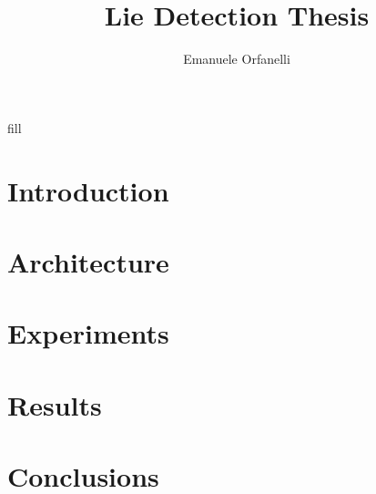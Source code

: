 \documentclass[LaM,binding=0.6cm,english,noexaminfo]{sapthesis}
\title{Lie Detection Thesis}
\author{Emanuele Orfanelli}
\begin{document}
\frontmatter

\maketitle

\dedication{Dedicated to\\ my Family and Friends}

\begin{acknowledgments}
fill
\end{acknowledgments}

\tableofcontents



\mainmatter

\chapter{Introduction}


\chapter{Architecture}


\chapter{Experiments}


\chapter{Results}


\chapter{Conclusions}


\backmatter

\printbibliography

\listoffigures

\cleardoublepage
\end{document}
